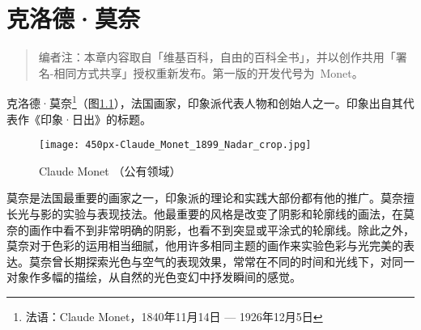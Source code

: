 % 
%
%
% 
%
%
\chapter{克洛德·莫奈}

\begin{quotation}
    编者注：本章内容取自「维基百科，自由的百科全书」，并以创作共用「署名-相同方式共享」授权重新发布。\xjtuthesis 第一版的开发代号为~Monet。
\end{quotation}

    克洛德·莫奈\footnote{法语：Claude Monet，1840年11月14日 --- 1926年12月5日}（图\ref{fig:claude-monet}），法国画家，印象派代表人物和创始人之一。印象出自其代表作《印象·日出》的标题。

    \begin{figure}[h!]
      \centering
      \texttt{[image: 450px-Claude\_Monet\_1899\_Nadar\_crop.jpg]}
      \caption{Claude Monet （公有领域）}
      \label{fig:claude-monet}
    \end{figure}

    莫奈是法国最重要的画家之一，印象派的理论和实践大部份都有他的推广。莫奈擅长光与影的实验与表现技法。他最重要的风格是改变了阴影和轮廓线的画法，在莫奈的画作中看不到非常明确的阴影，也看不到突显或平涂式的轮廓线。除此之外，莫奈对于色彩的运用相当细腻，他用许多相同主题的画作来实验色彩与光完美的表达。莫奈曾长期探索光色与空气的表现效果，常常在不同的时间和光线下，对同一对象作多幅的描绘，从自然的光色变幻中抒发瞬间的感觉。

